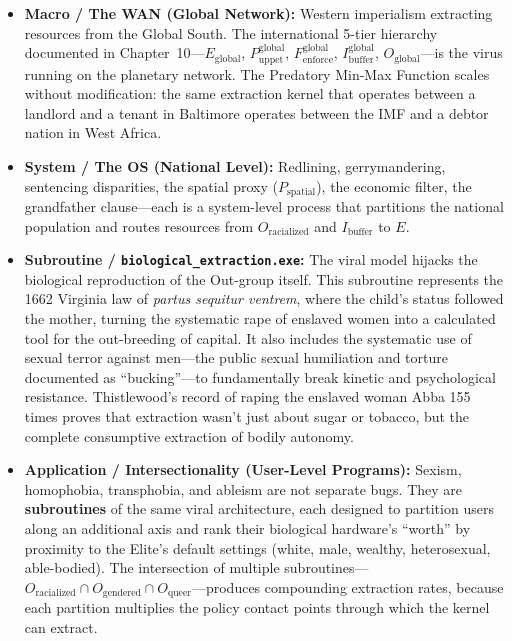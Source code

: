 \documentclass[12pt,openany]{book}
\begin{document}
\begin{itemize}
    \item \textbf{Macro / The WAN (Global Network):} Western imperialism extracting resources from the Global South. The international 5-tier hierarchy documented in Chapter~10---$E_{\text{global}}$, $P_{\text{uppet}}^{\text{global}}$, $F_{\text{enforce}}^{\text{global}}$, $I_{\text{buffer}}^{\text{global}}$, $O_{\text{global}}$---is the virus running on the planetary network. The Predatory Min-Max Function scales without modification: the same extraction kernel that operates between a landlord and a tenant in Baltimore operates between the IMF and a debtor nation in West Africa.

    \item \textbf{System / The OS (National Level):} Redlining, gerrymandering, sentencing disparities, the spatial proxy ($P_{\text{spatial}}$), the economic filter, the grandfather clause---each is a system-level process that partitions the national population and routes resources from $O_{\text{racialized}}$ and $I_{\text{buffer}}$ to $E$.

    \item \textbf{Subroutine / \texttt{biological\_extraction.exe}:} The viral model hijacks the biological reproduction of the Out-group itself. This subroutine represents the 1662 Virginia law of \textit{partus sequitur ventrem}, where the child's status followed the mother, turning the systematic rape of enslaved women into a calculated tool for the out-breeding of capital. It also includes the systematic use of sexual terror against men---the public sexual humiliation and torture documented as ``bucking''---to fundamentally break kinetic and psychological resistance. Thistlewood's record of raping the enslaved woman Abba 155 times proves that extraction wasn't just about sugar or tobacco, but the complete consumptive extraction of bodily autonomy.

    \item \textbf{Application / Intersectionality (User-Level Programs):} Sexism, homophobia, transphobia, and ableism are not separate bugs. They are \textbf{subroutines} of the same viral architecture, each designed to partition users along an additional axis and rank their biological hardware's ``worth'' by proximity to the Elite's default settings (white, male, wealthy, heterosexual, able-bodied). The intersection of multiple subroutines---$O_{\text{racialized}} \cap O_{\text{gendered}} \cap O_{\text{queer}}$---produces compounding extraction rates, because each partition multiplies the policy contact points through which the kernel can extract.


\end{itemize}
\end{document}
